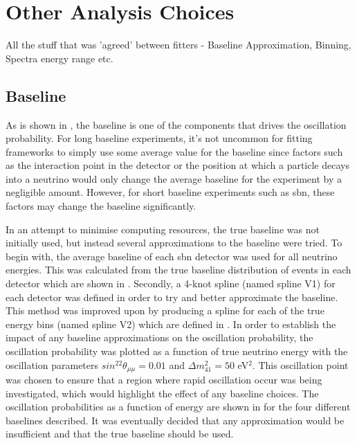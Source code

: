 \section{Other Analysis Choices}
All the stuff that was 'agreed' between fitters - Baseline Approximation, Binning, Spectra energy range etc.

\subsection{Baseline}
As is shown in , the baseline is one of the components that drives the oscillation probability. For long baseline experiments, it's not uncommon for fitting frameworks to simply use some average value for the baseline since factors such as the interaction point in the detector or the position at which a particle decays into a neutrino would only change the average baseline for the experiment by a negligible amount. However, for short baseline experiments such as \gls{sbn}, these factors may change the baseline significantly. 

In an attempt to minimise computing resources, the true baseline was not initially used, but instead several approximations to the baseline were tried. To begin with, the average baseline of each \gls{sbn} detector was used for all neutrino energies. This was calculated from the true baseline distribution of \numu events in each detector which are shown in . Secondly, a 4-knot spline (named spline V1) for each detector was defined in order to try and better approximate the baseline. This method was improved upon by producing a spline for each of the true energy bins (named spline V2) which are defined in . In order to establish the impact of any baseline approximations on the oscillation probability, the oscillation probability was plotted as a function of true neutrino energy with the oscillation parameters $sin^22\theta_{\mu\mu} = 0.01$ and $\Delta m^2_{41} = 50$ eV$^2$. This oscillation point was chosen to ensure that a region where rapid oscillation occur was being investigated, which would highlight the effect of any baseline choices. The oscillation probabilities as a function of energy are shown in  for the four different baselines described. It was eventually decided that any approximation would be insufficient and that the true baseline should be used. 

